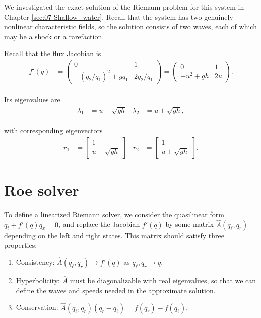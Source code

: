 \documentclass{SIAMbook2016}
\providecommand{\tightlist}{%
      \setlength{\itemsep}{0pt}\setlength{\parskip}{0pt}}
\begin{document}
We investigated the exact solution of the Riemann problem for this
system in Chapter \ref{sec:07-Shallow_water}. Recall that the system has
two genuinely nonlinear characteristic fields, so the solution consists
of two waves, each of which may be a shock or a rarefaction.

Recall that the flux Jacobian is\\
\begin{align}
f'(q) & = \begin{pmatrix} 0 & 1 \\ -(q_2/q_1)^2 + g q_1 & 2 q_2/q_1 \end{pmatrix} 
        = \begin{pmatrix} 0 & 1 \\ -u^2 + g h & 2 u \end{pmatrix}.
\end{align}\\
Its eigenvalues are\\
\begin{align} \label{SWA:char-speeds}
    \lambda_1 & = u - \sqrt{gh} & \lambda_2 & = u + \sqrt{gh},
\end{align}\\
with corresponding eigenvectors\\
\begin{align} \label{SWA:fjac-evecs}
    r_1 & = \begin{bmatrix} 1 \\ u-\sqrt{gh} \end{bmatrix} &
    r_2 & = \begin{bmatrix} 1 \\ u+\sqrt{gh} \end{bmatrix}.
\end{align}

\hypertarget{roe-solver}{%
\section{Roe solver}\label{roe-solver}}

To define a linearized Riemann solver, we consider the quasilinear form
\(q_t + f'(q)q_x=0\), and replace the Jacobian \(f'(q)\) by some matrix
\(\hat{A}(q_\ell,q_r)\) depending on the left and right states. This
matrix should satisfy three properties:

\begin{enumerate}
\def\labelenumi{\arabic{enumi}.}
\tightlist
\item
  Consistency: \(\hat{A}(q_\ell,q_r) \to f'(q)\) as
  \(q_\ell, q_r \to q\).
\item
  Hyperbolicity: \(\hat{A}\) must be diagonalizable with real
  eigenvalues, so that we can define the waves and speeds needed in the
  approximate solution.
\item
  Conservation:
  \(\hat{A}(q_\ell,q_r)(q_r - q_\ell) = f(q_r) - f(q_\ell)\).
\end{enumerate}
\end{document}
